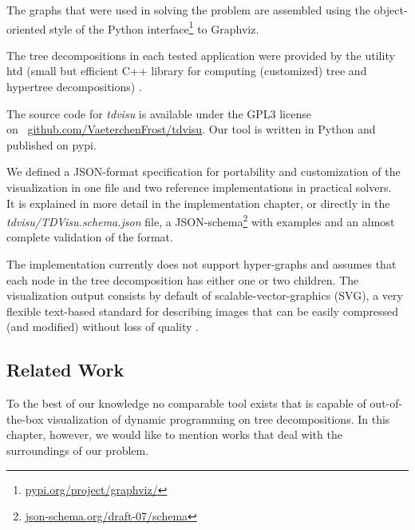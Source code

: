 \documentclass[a4paper, 12pt, bibliography=totoc]{scrartcl}
\begin{document}
The graphs that were used in solving the problem are assembled using the object-oriented style of the Python interface\footnote{\url{pypi.org/project/graphviz/}} to Graphviz.

The tree decompositions in each tested application were provided by the utility {htd} (small but efficient C++ library for computing (customized) tree and hypertree decompositions) \cite{htd}.

The source code for \textit{tdvisu} is available under the GPL3 license \\on
\mbox{ \url{github.com/VaeterchenFrost/tdvisu}}. Our tool is written in Python and published on pypi.

We defined a {JSON}-format specification for portability and customization of the visualization in one file and two reference implementations in practical solvers.\\
It is explained in more detail in the implementation chapter, or directly in the \textit{tdvisu/TDVisu.schema.json} file, a JSON-schema\footnote{\url{json-schema.org/draft-07/schema}} with examples and an almost complete validation of the format.

The implementation currently does not support hyper-graphs and assumes that each node in the tree decomposition has either one or two children.
The visualization output consists by default of scalable-vector-graphics (SVG), a very flexible text-based standard for describing images that can be easily compressed (and modified) without loss of quality \cite{SVGMozilla}.



\subsection{Related Work}

To the best of our knowledge no comparable tool exists that is capable of out-of-the-box visualization of dynamic programming on tree decompositions.
In this chapter, however, we would like to mention works that deal with the surroundings of our problem.
\end{document}
